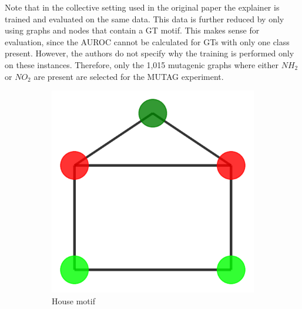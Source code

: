 Note that in the collective setting used in the original paper the explainer is trained and evaluated on the same data. This data is further reduced by only using graphs and nodes that contain a \ac{GT} motif. This makes sense for evaluation, since the AUROC cannot be calculated for \acp{GT} with only one class present. However, the authors do not specify why the training is performed only on these instances. Therefore, only the 1,015 mutagenic graphs where either $NH_2$ or $NO_2$ are present are selected for the MUTAG experiment. \bigskip

\begin{figure}[h]
    \centering
    \begin{subfigure}[b]{0.2\textwidth}
        \includegraphics[width=\linewidth]{img/Motif_Vis/BA-Shapes-MOTIF.pdf}
        \caption{House motif}
        \label{fig:subfig1}
    \end{subfigure}
    \begin{subfigure}[b]{0.2\textwidth}

\end{subfigure}
\end{figure}
